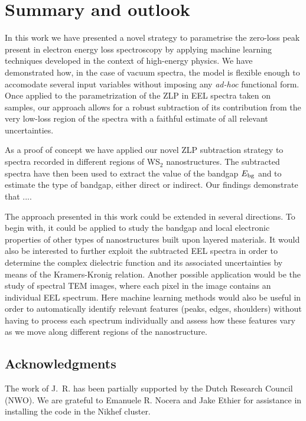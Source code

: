 \section{Summary and outlook}
\label{sec:summary}

In this work we have presented a novel strategy to parametrise
the zero-loss peak present in electron energy loss spectroscopy
by applying machine learning techniques developed
in the context of high-energy physics.
%
We have demonstrated how, in the case of vacuum spectra, the model
is flexible enough to accomodate several input variables without
imposing any {\it ad-hoc} functional form.
%
Once applied to the parametrization of the ZLP in EEL spectra taken
on samples, our approach allows for a robust subtraction of its contribution
from the very low-loss region of the spectra with a faithful
estimate of all relevant uncertainties.

As a proof of concept we have applied our novel ZLP subtraction
strategy to spectra recorded in different regions of WS$_2$ nanostructures.
%
The subtracted spectra have then been used to extract the value
of the bandgap $E_{\rm bg}$ and to estimate the type of bandgap,
either direct or indirect.
%
Our findings demonstrate that ....

The approach presented in this work could be extended
in several directions.
%
To begin with, it could be applied to study the bandgap
and local electronic properties of other types
of nanostructures built upon layered materials.
%
It would also be interested to  further exploit the subtracted EEL spectra
in order to determine the complex dielectric function and its associated
uncertainties by means of the Kramers-Kronig relation.
%
Another possible application would be the study of spectral TEM images,
where each pixel in the image contains an individual EEL spectrum.
%
Here machine learning methods would also be useful in order
to  automatically identify relevant features (peaks, edges, shoulders)
without having to process each spectrum individually and assess
how these features vary as we move along different regions of the
nanostructure.

\subsection*{Acknowledgments}
%
The work of J.~R. has been partially supported by the
Dutch Research Council (NWO).
%
We are grateful to Emanuele R. Nocera and Jake Ethier for
assistance in installing the code in the Nikhef cluster.
